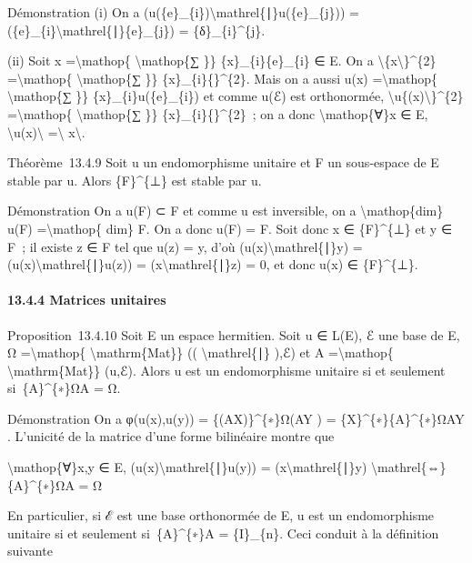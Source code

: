\documentclass[]{article}
\begin{document}
Démonstration (i) On a
(u(\{e\}\_\{i\})\textbackslash{}mathrel\{∣\}u(\{e\}\_\{j\})) =
(\{e\}\_\{i\}\textbackslash{}mathrel\{∣\}\{e\}\_\{j\}) =
\{δ\}\_\{i\}\^{}\{j\}.

(ii) Soit x =\textbackslash{}mathop\{ \textbackslash{}mathop\{∑ \}\}
\{x\}\_\{i\}\{e\}\_\{i\} ∈ E. On a
\textbackslash{}\textbar{}\{x\textbackslash{}\textbar{}\}\^{}\{2\}
=\textbackslash{}mathop\{ \textbackslash{}mathop\{∑ \}\}
\textbar{}\{x\}\_\{i\}\{\textbar{}\}\^{}\{2\}. Mais on a aussi u(x)
=\textbackslash{}mathop\{ \textbackslash{}mathop\{∑ \}\}
\{x\}\_\{i\}u(\{e\}\_\{i\}) et comme u(ℰ) est orthonormée,
\textbackslash{}\textbar{}u\{(x)\textbackslash{}\textbar{}\}\^{}\{2\}
=\textbackslash{}mathop\{ \textbackslash{}mathop\{∑ \}\}
\textbar{}\{x\}\_\{i\}\{\textbar{}\}\^{}\{2\}~; on a donc
\textbackslash{}mathop\{∀\}x ∈ E,
\textbackslash{}\textbar{}u(x)\textbackslash{}\textbar{}
=\textbackslash{}\textbar{} x\textbackslash{}\textbar{}.

Théorème~13.4.9 Soit u un endomorphisme unitaire et F un sous-espace de
E stable par u. Alors \{F\}\^{}\{⊥\} est stable par u.

Démonstration On a u(F) ⊂ F et comme u est inversible, on a
\textbackslash{}mathop\{dim\} u(F) =\textbackslash{}mathop\{ dim\} F. On
a donc u(F) = F. Soit donc x ∈ \{F\}\^{}\{⊥\} et y ∈ F~; il existe z ∈ F
tel que u(z) = y, d'où (u(x)\textbackslash{}mathrel\{∣\}y) =
(u(x)\textbackslash{}mathrel\{∣\}u(z)) =
(x\textbackslash{}mathrel\{∣\}z) = 0, et donc u(x) ∈ \{F\}\^{}\{⊥\}.

\paragraph{13.4.4 Matrices unitaires}

Proposition~13.4.10 Soit E un espace hermitien. Soit u ∈ L(E), ℰ une
base de E, Ω =\textbackslash{}mathop\{ \textbackslash{}mathrm\{Mat\}\}
(( \textbackslash{}mathrel\{∣\} ),ℰ) et A =\textbackslash{}mathop\{
\textbackslash{}mathrm\{Mat\}\} (u,ℰ). Alors u est un endomorphisme
unitaire si et seulement si~\{A\}\^{}\{∗\}ΩA = Ω.

Démonstration On a φ(u(x),u(y)) = \{(AX)\}\^{}\{∗\}Ω(AY ) =
\{X\}\^{}\{∗\}\{A\}\^{}\{∗\}ΩAY . L'unicité de la matrice d'une forme
bilinéaire montre que

\textbackslash{}mathop\{∀\}x,y ∈ E,
(u(x)\textbackslash{}mathrel\{∣\}u(y)) =
(x\textbackslash{}mathrel\{∣\}y) \textbackslash{}mathrel\{⇔\}
\{A\}\^{}\{∗\}ΩA = Ω

En particulier, si ℰ est une base orthonormée de E, u est un
endomorphisme unitaire si et seulement si~\{A\}\^{}\{∗\}A =
\{I\}\_\{n\}. Ceci conduit à la définition suivante
\end{document}
